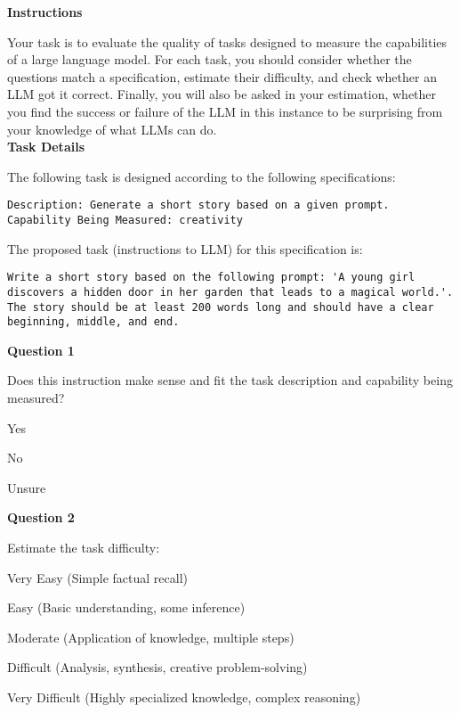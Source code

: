 \begin{tcolorbox}[breakable,boxrule=0.5pt,sharp corners,fontupper=\small,
colback=orange!5!white, colframe=orange!80!black, title={Human Surveying Script}]
\textbf{Instructions}

Your task is to evaluate the quality of tasks designed to measure the capabilities of a large language model. For each task, you should consider whether the questions match a specification, estimate their difficulty, and check whether an LLM got it correct. Finally, you will also be asked in your estimation, whether you find the success or failure of the LLM in this instance to be surprising from your knowledge of what LLMs can do.\\

\textbf{Task Details}

The following task is designed according to the following specifications:

\begin{lstlisting}
Description: Generate a short story based on a given prompt.
Capability Being Measured: creativity
\end{lstlisting}

The proposed task (instructions to LLM) for this specification is:
\begin{lstlisting}
Write a short story based on the following prompt: 'A young girl discovers a hidden door in her garden that leads to a magical world.'. The story should be at least 200 words long and should have a clear beginning, middle, and end.
\end{lstlisting}

\textbf{Question 1}

Does this instruction make sense and fit the task description and capability being measured?
\begin{todolist}
    \item Yes
    \item No
    \item Unsure
\end{todolist}

\textbf{Question 2}

Estimate the task difficulty:
\begin{todolist}
    \item Very Easy (Simple factual recall)
    \item Easy (Basic understanding, some inference)
    \item Moderate (Application of knowledge, multiple steps)
    \item Difficult (Analysis, synthesis, creative problem-solving)
    \item Very Difficult (Highly specialized knowledge, complex reasoning)
\end{todolist}
\vspace{2mm}


\end{tcolorbox}
